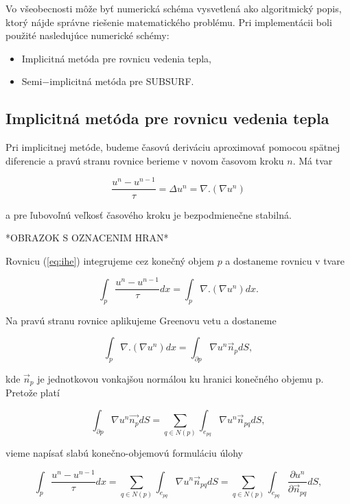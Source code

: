 \documentclass[a4paper,11pt,twoside]{article}%
\begin{document}
Vo všeobecnosti môže byť numerická schéma vysvetlená ako algoritmický popis, ktorý nájde správne riešenie matematického problému. Pri implementácii boli použité nasledujúce numerické schémy:

\begin{itemize}
\item Implicitná metóda pre rovnicu vedenia tepla,
\item Semi$-$implicitná metóda pre SUBSURF.
\end{itemize}

\subsection{Implicitná metóda pre rovnicu vedenia tepla}

Pri implicitnej metóde, budeme časovú deriváciu aproximovať pomocou spätnej diferencie a pravú stranu rovnice berieme v novom časovom kroku $n$. Má tvar

\begin{equation} \label{eq:ihe}
\frac{u^n - u^{n-1}}{\tau} = \Delta u^n = \nabla . (\nabla u^n)
\end{equation}

a pre ľubovoľnú veľkosť časového kroku je bezpodmienečne stabilná. 

*OBRAZOK S OZNACENIM HRAN*

Rovnicu (\ref{eq:ihe}) integrujeme cez konečný objem $p$ a dostaneme rovnicu v tvare

\begin{equation} 
\int_p\frac{u^n - u^{n-1}}{\tau} dx = \int_p\nabla . (\nabla u^n)dx.
\end{equation}

Na pravú stranu rovnice aplikujeme Greenovu vetu a dostaneme

\begin{equation} 
\int_p\nabla . (\nabla u^n)dx = \int_{\partial p} \nabla u^n \vec{n}_pdS,
\end{equation}

kde $\vec{n}_p$ je jednotkovou vonkajšou normálou ku hranici konečného objemu p.
Pretože platí

\begin{equation} 
\int_{\partial p} \nabla u^n \vec{n_p}dS = \sum_{q\in N(p)}\int_{e_{pq}} \nabla u^n \vec{n}_{pq}dS,
\end{equation}

vieme napísať slabú konečno-objemovú formuláciu úlohy

\begin{equation} 
\int_p\frac{u^n - u^{n-1}}{\tau} dx = \sum_{q\in N(p)}\int_{e_{pq}} \nabla u^n \vec{n}_{pq}dS = \sum_{q\in N(p)}\int_{e_{pq}} \frac{\partial u^n}{\partial \vec{n}_{pq}} dS,
\end{equation}
\end{document}
